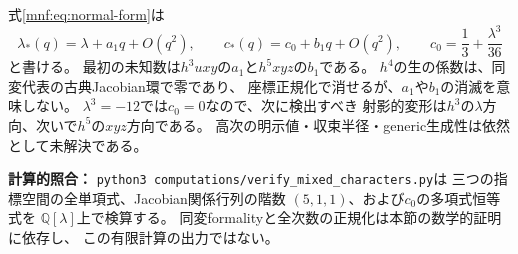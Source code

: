 \begin{remark}[次に計算すべき二係数]
式\eqref{mnf:eq:normal-form}は
\[
 \lambda_*(q)=\lambda+a_1q+O(q^2),\qquad
 c_*(q)=c_0+b_1q+O(q^2),\qquad
 c_0=\frac13+\frac{\lambda^3}{36}
\]
と書ける。
最初の未知数は$h^3uxy$の$a_1$と$h^5xyz$の$b_1$である。
$h^4$の生の係数は、同変代表の古典Jacobian環で零であり、
座標正規化で消せるが、$a_1$や$b_1$の消滅を意味しない。
$\lambda^3=-12$では$c_0=0$なので、次に検出すべき
射影的変形は$h^3$の$\lambda$方向、次いで$h^5$の$xyz$方向である。
高次の明示値・収束半径・generic生成性は依然として未解決である。
\end{remark}

\noindent
\textbf{計算的照合：}
\texttt{python3 computations/verify\_mixed\_characters.py}は
三つの指標空間の全単項式、Jacobian関係行列の階数
$(5,1,1)$、および$c_0$の多項式恒等式を
$\mathbb Q[\lambda]$上で検算する。
同変formalityと全次数の正規化は本節の数学的証明に依存し、
この有限計算の出力ではない。

